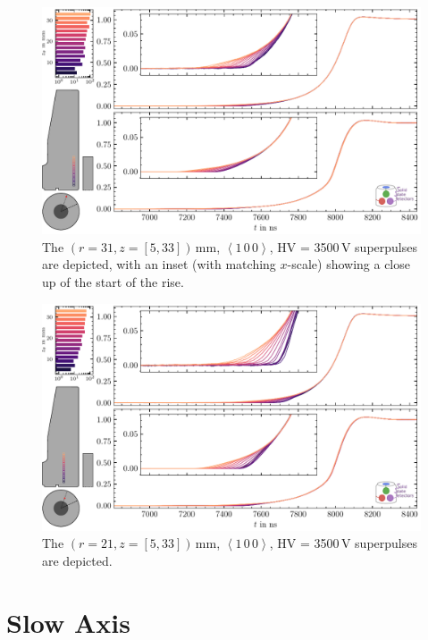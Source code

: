 \begin{figure}[H]
    \centering
    \includegraphics[width=6in]{figs/library/fast_axis_r_31_pulses.pdf}
    \caption{The $(r = 31, z = [5,33])$\,mm, $\left<1\,0\,0\right>$, HV = 3500\,V superpulses are depicted, with an inset (with matching $x$-scale) showing a close up of the start of the rise.}
\end{figure}
\begin{figure}[H]
    \centering
    \includegraphics[width=6in]{figs/library/fast_axis_r_21_pulses.pdf}
    \caption{The $(r = 21, z = [5,33])$\,mm, $\left<1\,0\,0\right>$, HV = 3500\,V superpulses are depicted.}
\end{figure}


\section{Slow Axis}

